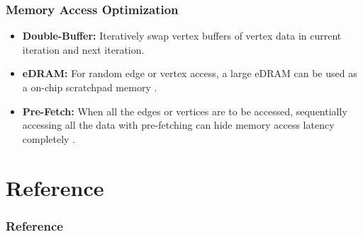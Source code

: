 \documentclass{beamer}
\begin{document}
\begin{frame}[t]
    \frametitle{Memory Access Optimization}
    \begin{itemize}
        \item \textbf{Double-Buffer:} Iteratively swap vertex buffers of
            vertex data in current iteration and next iteration.
        \item \textbf{eDRAM:} For random edge or vertex access, a large eDRAM
            can be used as a on-chip scratchpad memory \cite{hamgra2016graphicionado}. 
        \item \textbf{Pre-Fetch:} When all the edges or vertices are to be
            accessed, sequentially accessing all the data with pre-fetching can
            hide memory access latency completely \cite{hamgra2016graphicionado}.
    \end{itemize}
\end{frame}

\section{Reference}
\begin{frame}[t]
    \frametitle{Reference}
    \tiny
    
    
\end{frame}
\end{document}
